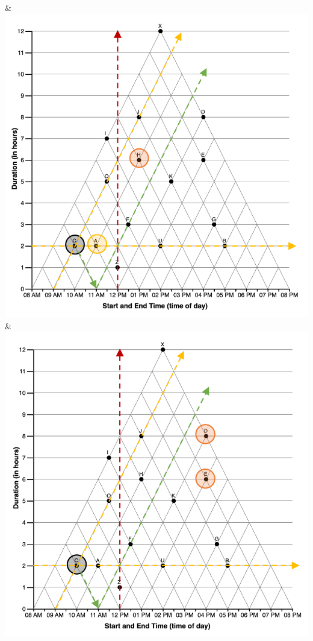 \documentclass[
  letterpaper,
  DIV=11,
  numbers=noendperiod]{scrreprt}
\begin{document}
\begin{longtable}[]
& \includegraphics{analysis/SGC3A/static/interpretations/Q3_111_AH.png}
&
\includegraphics{analysis/SGC3A/static/interpretations/Q3_111_ED.png} \\

\end{longtable}
\end{document}
